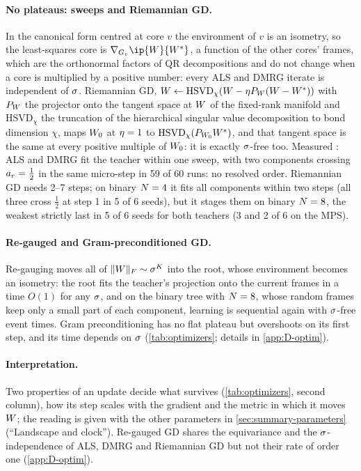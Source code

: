 \paragraph{No plateaus: sweeps and Riemannian GD.}
\proven{} \newresult[elementary] In the canonical form centred at core $v$ the environment of $v$ is an isometry, so
the least-squares core is $\nabla_{\G v}\ip{\W}{\Wt}$, a function of the other cores' frames, which are the orthonormal factors of
QR decompositions and do not change when a core is multiplied by a positive number: every ALS and DMRG iterate is
independent of $\sigma$. Riemannian GD, $W\leftarrow\mathrm{HSVD}_\chi(W-\eta P_{W}(W-W^{*}))$ with $P_{W}$ the
projector onto the tangent space at $W$ of the fixed-rank manifold and $\mathrm{HSVD}_\chi$ the truncation of the
hierarchical singular value decomposition to bond dimension $\chi$, maps $W_0$ at $\eta=1$ to
$\mathrm{HSVD}_\chi(P_{W_0}W^{*})$, and that tangent space is the same at every positive multiple of $W_0$: it is exactly
$\sigma$-free too. Measured \empirical: ALS and DMRG fit the
teacher within one sweep, with two components crossing $a_{r}=\frac12$ in the same micro-step in 59 of 60 runs: no
resolved order. Riemannian GD needs 2--7 steps; on binary $N=4$ it fits all components within two steps (all three
cross $\frac12$ at step 1 in 5 of 6 seeds), but it stages them on binary $N=8$, the weakest strictly last in 5 of 6
seeds for both teachers (3 and 2 of 6 on the MPS).

\paragraph{Re-gauged and Gram-preconditioned GD.}
\derived{} \empirical{} Re-gauging moves all of $\lVert W\rVert_{F}\sim\sigma^K$ into the root, whose environment becomes an
isometry: the root fits the teacher's projection onto the current frames in a time $O(1)$ for any $\sigma$, and on the
binary tree with $N=8$, whose random frames keep only a small part of each component, learning is sequential
again with $\sigma$-free event times. Gram preconditioning has no flat plateau but overshoots on its first step, and its time
depends on $\sigma$ (\cref{tab:optimizers}; details in \cref{app:D-optim}).

\paragraph{Interpretation.}
Two properties of an update decide what survives (\cref{tab:optimizers}, second column), how its step scales with
the gradient and the metric in which it moves $W$; the reading is given with the other parameters in
\cref{sec:summary-parameters} (``Landscape and clock''). Re-gauged GD shares the equivariance and the
$\sigma$-independence of ALS, DMRG and Riemannian GD but not their rate of order one (\cref{app:D-optim}).
